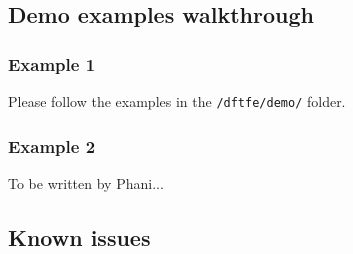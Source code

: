 \subsection{Demo examples walkthrough}
\subsubsection{Example 1}
Please follow the examples in the \verb|/dftfe/demo/| folder.

\subsubsection{Example 2}
To be written by Phani...

\subsection{Known issues}
